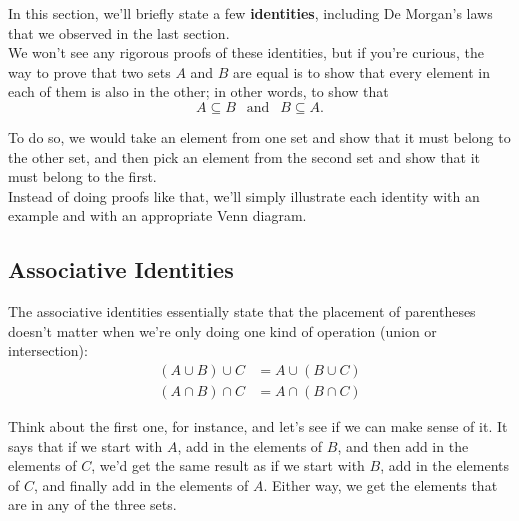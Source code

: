 \setcounter{ExampleCounter}{1}
In this section, we'll briefly state a few \textbf{identities}, including De Morgan's laws that we observed in the last section.\\

We won't see any rigorous proofs of these identities, but if you're curious, the way to prove that two sets $A$ and $B$ are equal is to show that every element in each of them is also in the other; in other words, to show that
\[A \subseteq B \ \ \textrm{ and } \ \ B \subseteq A.\]

To do so, we would take an element from one set and show that it must belong to the other set, and then pick an element from the second set and show that it must belong to the first.\\

Instead of doing proofs like that, we'll simply illustrate each identity with an example and with an appropriate Venn diagram.

\subsection{Associative Identities}
The associative identities essentially state that the placement of parentheses doesn't matter when we're only doing one kind of operation (union or intersection):
\begin{align*}
(A \cup B) \cup C &= A \cup (B \cup C)\\
(A \cap B) \cap C &= A \cap (B \cap C)
\end{align*}

Think about the first one, for instance, and let's see if we can make sense of it.  It says that if we start with $A$, add in the elements of $B$, and then add in the elements of $C$, we'd get the same result as if we start with $B$, add in the elements of $C$, and finally add in the elements of $A$.  Either way, we get the elements that are in any of the three sets.

